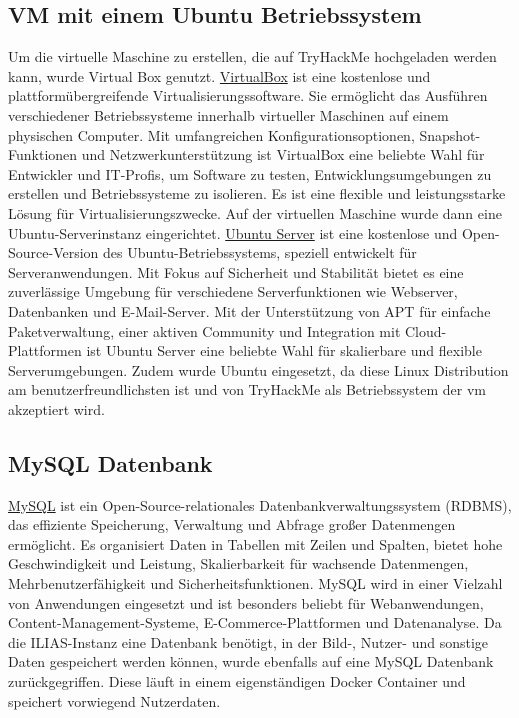 \documentclass[10pt, a4paper,onecolumn ,titlepage]{article}
\begin{document}
    \subsection{VM mit einem Ubuntu Betriebssystem}
    \label{subsec:ubuntu}
    Um die virtuelle Maschine zu erstellen, die auf TryHackMe hochgeladen werden kann, wurde Virtual Box genutzt.
    \href{https://www.virtualbox.org/}{VirtualBox} ist eine kostenlose und plattformübergreifende Virtualisierungssoftware.
    Sie ermöglicht das Ausführen verschiedener Betriebssysteme innerhalb virtueller Maschinen auf einem physischen Computer.
    Mit umfangreichen Konfigurationsoptionen, Snapshot-Funktionen und Netzwerkunterstützung ist VirtualBox eine beliebte Wahl für Entwickler und IT-Profis, um Software zu testen, Entwicklungsumgebungen zu erstellen und Betriebssysteme zu isolieren.
    Es ist eine flexible und leistungsstarke Lösung für Virtualisierungszwecke.
    Auf der virtuellen Maschine wurde dann eine Ubuntu-Serverinstanz eingerichtet.
    \href{https://ubuntu.com/server}{Ubuntu Server} ist eine kostenlose und Open-Source-Version des Ubuntu-Betriebssystems, speziell entwickelt für Serveranwendungen.
    Mit Fokus auf Sicherheit und Stabilität bietet es eine zuverlässige Umgebung für verschiedene Serverfunktionen wie Webserver, Datenbanken und E-Mail-Server.
    Mit der Unterstützung von APT für einfache Paketverwaltung, einer aktiven Community und Integration mit Cloud-Plattformen ist Ubuntu Server eine beliebte Wahl für skalierbare und flexible Serverumgebungen.
    Zudem wurde Ubuntu eingesetzt, da diese Linux Distribution am benutzerfreundlichsten ist und von TryHackMe als Betriebssystem der \ac{vm} akzeptiert wird.


    \subsection{MySQL Datenbank}
    \label{subsec:mysqlDatenbank}
    \href{https://www.mysql.com/}{MySQL} ist ein Open-Source-relationales Datenbankverwaltungssystem (RDBMS), das effiziente Speicherung, Verwaltung und Abfrage großer Datenmengen ermöglicht.
    Es organisiert Daten in Tabellen mit Zeilen und Spalten, bietet hohe Geschwindigkeit und Leistung, Skalierbarkeit für wachsende Datenmengen, Mehrbenutzerfähigkeit und Sicherheitsfunktionen.
    MySQL wird in einer Vielzahl von Anwendungen eingesetzt und ist besonders beliebt für Webanwendungen, Content-Management-Systeme, E-Commerce-Plattformen und Datenanalyse.
    Da die ILIAS-Instanz eine Datenbank benötigt, in der Bild-, Nutzer- und sonstige Daten gespeichert werden können, wurde ebenfalls auf eine MySQL Datenbank zurückgegriffen.
    Diese läuft in einem eigenständigen Docker Container und speichert vorwiegend Nutzerdaten.
\end{document}

